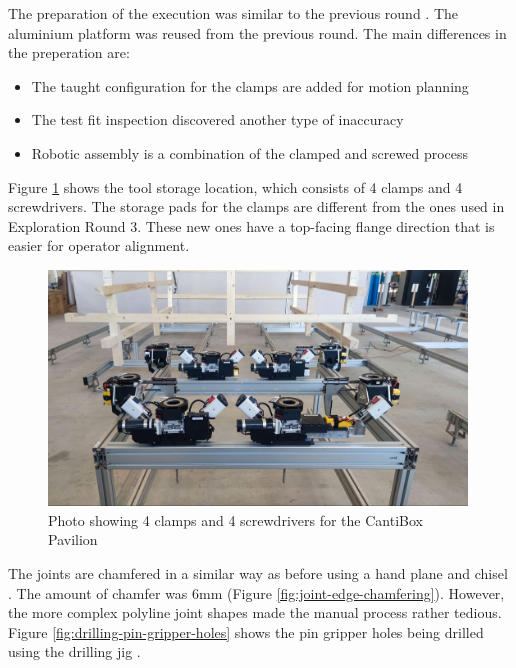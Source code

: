 The preparation of the execution was similar to the previous round . The aluminium platform was reused from the previous round. The main differences in the preperation are:

\begin{itemize}
	\item The taught configuration for the clamps are added for motion planning
	\item The test fit inspection discovered another type of inaccuracy 
	\item Robotic assembly is a combination of the clamped and screwed process 
\end{itemize}

Figure \ref{fig:photo-clamps-and-screwdrivers} shows the tool storage location, which consists of 4 clamps and 4 screwdrivers. The storage pads for the clamps are different from the ones used in Exploration Round 3. These new ones have a top-facing flange direction that is easier for operator alignment.

\begin{figure}[!h]
    \centering
    \includegraphics[width=0.99\textwidth]{images/08/img27.jpg}
    \caption{Photo showing 4 clamps and 4 screwdrivers for the CantiBox Pavilion}
    \label{fig:photo-clamps-and-screwdrivers}
\end{figure}

The joints are chamfered in a similar way as before using a hand plane and chisel . The amount of chamfer was 6mm (Figure \ref{fig:joint-edge-chamfering}). However, the more complex polyline joint shapes made the manual process rather tedious. Figure \ref{fig:drilling-pin-gripper-holes} shows the pin gripper holes being drilled using the drilling jig .

